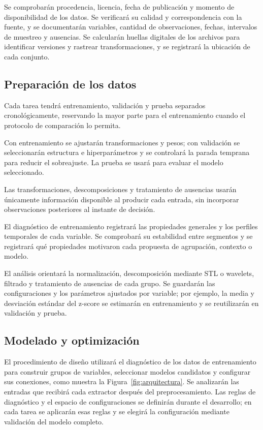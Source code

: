 \documentclass[11pt,letterpaper]{article}
\begin{document}
Se comprobarán procedencia, licencia, fecha de publicación y momento de disponibilidad de los datos. Se verificará su calidad y correspondencia con la fuente, y se documentarán variables, cantidad de observaciones, fechas, intervalos de muestreo y ausencias. Se calcularán huellas digitales de los archivos para identificar versiones y rastrear transformaciones, y se registrará la ubicación de cada conjunto.

\subsection{Preparación de los datos}
\label{sec:datos}

Cada tarea tendrá entrenamiento, validación y prueba separados cronológicamente, reservando la mayor parte para el entrenamiento cuando el protocolo de comparación lo permita. 

Con entrenamiento se ajustarán transformaciones y pesos; con validación se seleccionarán estructura e hiperparámetros y se controlará la parada temprana para reducir el sobreajuste. La prueba se usará para evaluar el modelo seleccionado. 

Las transformaciones, descomposiciones y tratamiento de ausencias usarán únicamente información disponible al producir cada entrada, sin incorporar observaciones posteriores al instante de decisión.

El diagnóstico de entrenamiento registrará las propiedades generales y los perfiles temporales de cada variable. Se comprobará su estabilidad entre segmentos y se registrará qué propiedades motivaron cada propuesta de agrupación, contexto o modelo.

El análisis orientará la normalización, descomposición mediante STL o wavelets, filtrado y tratamiento de ausencias de cada grupo. Se guardarán las configuraciones y los parámetros ajustados por variable; por ejemplo, la media y desviación estándar del z-score se estimarán en entrenamiento y se reutilizarán en validación y prueba.

\subsection{Modelado y optimización}

El procedimiento de diseño utilizará el diagnóstico de los datos de entrenamiento para construir grupos de variables, seleccionar modelos candidatos y configurar sus conexiones, como muestra la Figura~\ref{fig:arquitectura}. Se analizarán las entradas que recibirá cada extractor después del preprocesamiento. Las reglas de diagnóstico y el espacio de configuraciones se definirán durante el desarrollo; en cada tarea se aplicarán esas reglas y se elegirá la configuración mediante validación del modelo completo.
\end{document}
